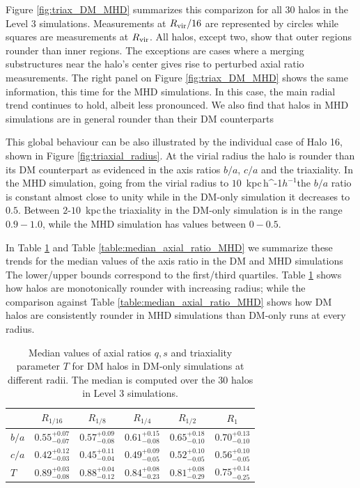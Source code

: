 \documentclass[a4paper,fleqn,usenatbib]{mnras}
\newcommand{\kpch}{\,{\rm kpc}\,\ifmmode h^{-1}\else $h^{-1}$\fi}
\newcommand{\kpc}{\,{\rm kpc}\,}
\begin{document}
Figure \ref{fig:triax_DM_MHD} summarizes this comparizon for all 30 halos
in the Level 3 simulations. 
Measurements at $R_{\rm vir}/16$ are represented by circles while squares 
are measurements at $R_{\rm vir}$. 
All halos, except two, show that outer regions rounder than inner
regions.
The exceptions are cases where a merging substructures near  the
halo's center gives rise to perturbed axial ratio measurements. 
The right panel on Figure \ref{fig:triax_DM_MHD} shows the same information, this time for
the MHD simulations. 
In this case, the main radial trend continues to hold, albeit less
pronounced.
We also find that halos in MHD simulations are in general rounder than
their DM counterparts


This global behaviour can be also illustrated by the individual case
of Halo 16, shown in Figure \ref{fig:triaxial_radius}.
At the virial radius the halo is rounder than its DM counterpart as
evidenced in the axis ratios $b/a$, $c/a$ and the triaxiality.
In the MHD simulation, going from the virial radius to $10$ \kpch the
$b/a$ ratio is constant almost close to unity while in the DM-only
simulation it decreases to $0.5$.
Between $2$-$10$ \kpc the triaxiality in the DM-only simulation is in
the range $0.9-1.0$, while the MHD simulation has values between
$0-0.5$. 


In Table \ref{table:median_axial_ratio_DM} and Table \ref{table:median_axial_ratio_MHD}
we summarize these trends for the median values of the axis ratio in
the DM and MHD simulations
The lower/upper bounds correspond to the first/third quartiles. 
Table  \ref{table:median_axial_ratio_DM} shows how halos are
monotonically rounder with increasing radius; while the comparison
against Table \ref{table:median_axial_ratio_MHD} shows how DM halos
are consistently rounder in MHD simulations than DM-only runs at every
radius. 





\begin{table}
\setlength{\tabcolsep}{3pt}
\begin{center}
\begin{tabular}{l|ccccc}
 &$R_{1/16}$& $R_{1/8}$& $R_{1/4}$& $R_{1/2}$& $R_1$\\
\hline 
$b/a$ &$0.55^{+0.07}_{-0.07}$&$0.57^{+0.09}_{-0.08}$&$0.61^{+0.15}_{-0.08}$&$0.65^{+0.18}_{-0.10}$&$0.70^{+0.13}_{-0.10}$ \\ [0.1cm]
$c/a$ &$0.42^{+0.12}_{-0.03}$&$0.45^{+0.11}_{-0.04}$&$0.49^{+0.09}_{-0.05}$&$0.52^{+0.10}_{-0.05}$&$0.56^{+0.10}_{-0.05}$\\ [0.1cm]
$T$ &$0.89^{+0.03}_{-0.08}$&$0.88^{+0.04}_{-0.12}$&$0.84^{+0.08}_{-0.23}$&$0.81^{+0.08}_{-0.29}$&$0.75^{+0.14}_{-0.25}$\\ [0.1cm]
\end{tabular}
\end{center}
\caption{Median values of axial ratios $q,s$ and triaxiality parameter
  $T$ for DM halos in DM-only simulations at different radii. The
  median is computed over the 30 halos in Level 3 simulations.}  
\label{table:median_axial_ratio_DM}
\end{table}
\end{document}
